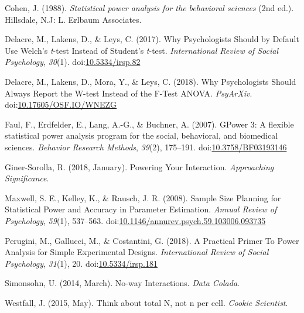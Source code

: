 \documentclass[,jou, draftfirst, a4paper,floatsintext]{apa6}
\begin{document}
\leavevmode\hypertarget{ref-cohen_statistical_1988}{}%
Cohen, J. (1988). \emph{Statistical power analysis for the behavioral sciences} (2nd ed.). Hillsdale, N.J: L. Erlbaum Associates.

\leavevmode\hypertarget{ref-delacre_why_2017}{}%
Delacre, M., Lakens, D., \& Leys, C. (2017). Why Psychologists Should by Default Use Welch's \emph{t}-test Instead of Student's \emph{t}-test. \emph{International Review of Social Psychology}, \emph{30}(1). doi:\href{https://doi.org/10.5334/irsp.82}{10.5334/irsp.82}

\leavevmode\hypertarget{ref-delacre_why_2018}{}%
Delacre, M., Lakens, D., Mora, Y., \& Leys, C. (2018). Why Psychologists Should Always Report the W-test Instead of the F-Test ANOVA. \emph{PsyArXiv}. doi:\href{https://doi.org/10.17605/OSF.IO/WNEZG}{10.17605/OSF.IO/WNEZG}

\leavevmode\hypertarget{ref-faul_gpower_2007}{}%
Faul, F., Erdfelder, E., Lang, A.-G., \& Buchner, A. (2007). GPower 3: A flexible statistical power analysis program for the social, behavioral, and biomedical sciences. \emph{Behavior Research Methods}, \emph{39}(2), 175--191. doi:\href{https://doi.org/10.3758/BF03193146}{10.3758/BF03193146}

\leavevmode\hypertarget{ref-giner-sorolla_powering_2018}{}%
Giner-Sorolla, R. (2018, January). Powering Your Interaction. \emph{Approaching Significance}.

\leavevmode\hypertarget{ref-maxwell_sample_2008}{}%
Maxwell, S. E., Kelley, K., \& Rausch, J. R. (2008). Sample Size Planning for Statistical Power and Accuracy in Parameter Estimation. \emph{Annual Review of Psychology}, \emph{59}(1), 537--563. doi:\href{https://doi.org/10.1146/annurev.psych.59.103006.093735}{10.1146/annurev.psych.59.103006.093735}

\leavevmode\hypertarget{ref-perugini_practical_2018}{}%
Perugini, M., Gallucci, M., \& Costantini, G. (2018). A Practical Primer To Power Analysis for Simple Experimental Designs. \emph{International Review of Social Psychology}, \emph{31}(1), 20. doi:\href{https://doi.org/10.5334/irsp.181}{10.5334/irsp.181}

\leavevmode\hypertarget{ref-simonsohn_no-way_2014}{}%
Simonsohn, U. (2014, March). No-way Interactions. \emph{Data Colada}.

\leavevmode\hypertarget{ref-westfall_think_2015}{}%
Westfall, J. (2015, May). Think about total N, not n per cell. \emph{Cookie Scientist}.
\end{document}
